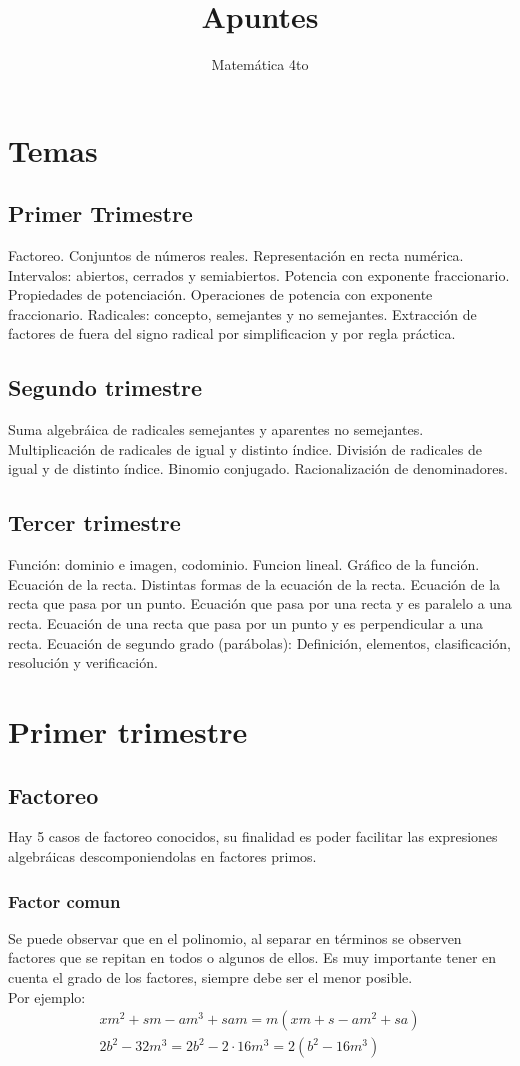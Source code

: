 \documentclass[a4paper]{article}
\title{Apuntes}
\author{Matemática 4to}
\begin{document}
\maketitle
\section{Temas}
\subsection{Primer Trimestre}
Factoreo. Conjuntos de números reales. Representación en recta numérica. Intervalos: abiertos, cerrados y semiabiertos. Potencia con exponente fraccionario. Propiedades de potenciación. Operaciones de potencia con exponente fraccionario. Radicales: concepto, semejantes y no semejantes. Extracción de factores de fuera del signo radical por simplificacion y por regla práctica.
\subsection{Segundo trimestre}
Suma algebráica de radicales semejantes y aparentes no semejantes. Multiplicación de radicales de igual y distinto índice. División de radicales de igual y de distinto índice. Binomio conjugado. Racionalización de denominadores.
\subsection{Tercer trimestre}
Función: dominio e imagen, codominio. Funcion lineal. Gráfico de la función. Ecuación de la recta. Distintas formas de la ecuación de la recta. Ecuación de la recta que pasa por un punto. Ecuación que pasa por una recta y es paralelo a una recta. Ecuación de una recta que pasa por un punto y es perpendicular a una recta. Ecuación de segundo grado (parábolas): Definición, elementos, clasificación, resolución y verificación.

\section{Primer trimestre}
\subsection{Factoreo}
Hay 5 casos de factoreo conocidos, su finalidad es poder facilitar las expresiones algebráicas descomponiendolas en factores primos.
\subsubsection{Factor comun}
Se puede observar que en el polinomio, al separar en términos se observen factores que se repitan en todos o algunos de ellos. Es muy importante tener en cuenta el grado de los factores, siempre debe ser el menor posible.\\
Por ejemplo:
\begin{gather*}
    xm^2 + sm - am^3 + sam = m(xm+s-am^2+sa)\\
    2b^2-32m^3=2b^2-2\cdot 16m^3=2(b^2-16m^3)
\end{gather*}
\end{document}
